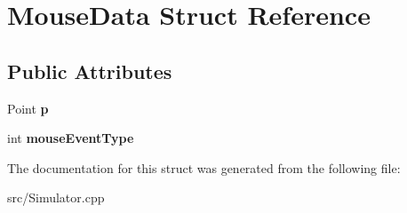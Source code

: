 \hypertarget{struct_mouse_data}{}\section{Mouse\+Data Struct Reference}
\label{struct_mouse_data}
\subsection*{Public Attributes}
\begin{DoxyCompactItemize}
\item 
Point {\bfseries p}\hypertarget{struct_mouse_data_ab275247c80cccf8300297d30b8ad41c0}{}\label{struct_mouse_data_ab275247c80cccf8300297d30b8ad41c0}

\item 
int {\bfseries mouse\+Event\+Type}\hypertarget{struct_mouse_data_ac8fe52747c878157cbff1d6eb2c22463}{}\label{struct_mouse_data_ac8fe52747c878157cbff1d6eb2c22463}

\end{DoxyCompactItemize}


The documentation for this struct was generated from the following file\+:\begin{DoxyCompactItemize}
\item 
src/Simulator.\+cpp\end{DoxyCompactItemize}
